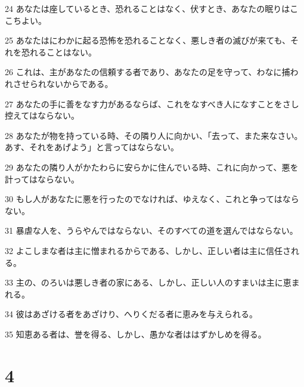 \par 24 あなたは座しているとき、恐れることはなく、伏すとき、あなたの眠りはここちよい。
\par 25 あなたはにわかに起る恐怖を恐れることなく、悪しき者の滅びが来ても、それを恐れることはない。
\par 26 これは、主があなたの信頼する者であり、あなたの足を守って、わなに捕われさせられないからである。
\par 27 あなたの手に善をなす力があるならば、これをなすべき人になすことをさし控えてはならない。
\par 28 あなたが物を持っている時、その隣り人に向かい、「去って、また来なさい。あす、それをあげよう」と言ってはならない。
\par 29 あなたの隣り人がかたわらに安らかに住んでいる時、これに向かって、悪を計ってはならない。
\par 30 もし人があなたに悪を行ったのでなければ、ゆえなく、これと争ってはならない。
\par 31 暴虐な人を、うらやんではならない、そのすべての道を選んではならない。
\par 32 よこしまな者は主に憎まれるからである、しかし、正しい者は主に信任される。
\par 33 主の、のろいは悪しき者の家にある、しかし、正しい人のすまいは主に恵まれる。
\par 34 彼はあざける者をあざけり、へりくだる者に恵みを与えられる。
\par 35 知恵ある者は、誉を得る、しかし、愚かな者ははずかしめを得る。

\chapter{4}

